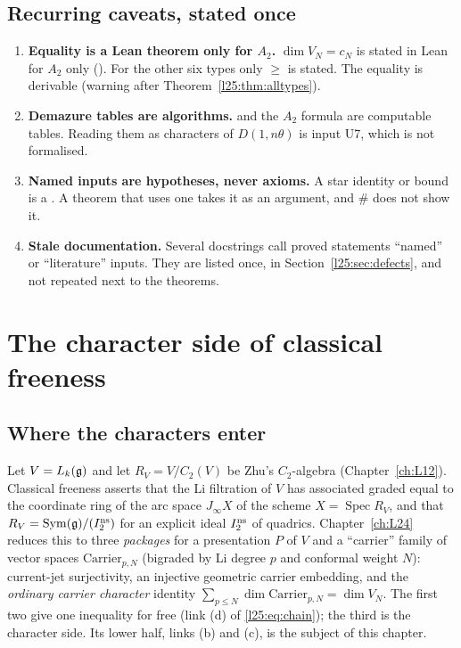 \subsection{Recurring caveats, stated once}\label{l25:sec:caveats}

\begin{enumerate}
\item\label{l25:cav:equality} \textbf{Equality is a Lean theorem only for $A_2$.} $\dim V_N=c_N$ is stated in Lean for
  $A_2$ only (). For the other six types only $\ge$ is stated. The equality is
  derivable (warning after Theorem~\ref{l25:thm:alltypes}).
\item\label{l25:cav:U7} \textbf{Demazure tables are algorithms.}  and the $A_2$ formula
   are computable tables. Reading them as characters of $D(1,n\theta)$ is input U7, which is not
  formalised.
\item\label{l25:cav:hyp} \textbf{Named inputs are hypotheses, never axioms.} A star identity or bound is a
  . A theorem that uses one takes it as an argument, and \# does not show it.
\item\label{l25:cav:docs} \textbf{Stale documentation.} Several docstrings call proved statements ``named'' or
  ``literature'' inputs. They are listed once, in Section~\ref{l25:sec:defects}, and not repeated next to the
  theorems.
\end{enumerate}

\section{The character side of classical freeness}\label{l25:sec:interface}

\subsection{Where the characters enter}

Let $V=L_k(\mathfrak g)$ and let $R_V=V/C_2(V)$ be Zhu's $C_2$-algebra (Chapter~\ref{ch:L12}). Classical
freeness asserts that the Li filtration of $V$ has associated graded equal to the coordinate ring of the arc
space $J_\infty X$ of the scheme $X=\operatorname{Spec}R_V$, and that $R_V=\operatorname{Sym}(\mathfrak g)/(I_2^{\rm
ns})$ for an explicit ideal $I_2^{\rm ns}$ of quadrics. Chapter~\ref{ch:L24} reduces this to three
\emph{packages} for a presentation $P$ of $V$ and a ``carrier'' family of vector spaces
$\mathrm{Carrier}_{p,N}$ (bigraded by Li degree $p$ and conformal weight $N$):
current-jet surjectivity, an injective geometric carrier embedding, and the \emph{ordinary carrier character}
identity $\sum_{p\le N}\dim\mathrm{Carrier}_{p,N}=\dim V_N$. The first two give one inequality
for free (link (d) of \eqref{l25:eq:chain}); the third is the character side. Its lower half, links (b) and (c), is
the subject of this chapter.


